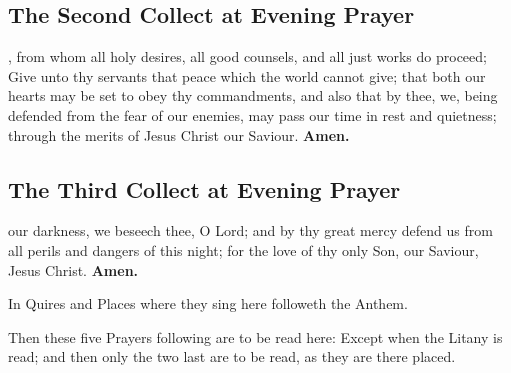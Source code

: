 \subsection{The Second Collect at Evening Prayer}

, from whom all holy desires, all good counsels, and all just works do proceed; Give unto thy servants that peace which the world cannot give; that both our hearts may be set to obey thy commandments, and also that by thee, we, being defended from the fear of our enemies, may pass our time in rest and quietness; through the merits of Jesus Christ our Saviour.
\textbf{Amen.}

\subsection{The Third Collect at Evening Prayer}

 our darkness, we beseech thee, O Lord; and by thy great mercy defend us from all perils and dangers of this night; for the love of thy only Son, our Saviour, Jesus Christ.
\textbf{Amen.}

\begin{rubric}
In Quires and Places where they sing here followeth the Anthem.
\end{rubric}

\begin{rubric}
Then these five Prayers following are to be read here: Except when the Litany is read; and then only the two last are to be read, as they are there placed.
\end{rubric}





\clearpage

